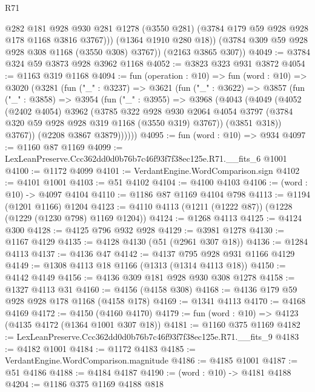 \begin{lexlean}{R71}
\begin{coremodule}
              @282
              @181
              @928
              @930
              @281
              @1278
              (@3550 @281)
              (@3784 @179 @59 @928 @928 @178 @1168 @3816 @3767)))
          (@1364 @1910 @280 @18))
        (@3784 @309 @59 @928 @928 @308 @1168 (@3550 @308) @3767))
      (@2163 @3865 @307))
@4049 := @3784 @324 @59 @3873 @928 @3962 @1168
@4052 := @3823 @323 @931 @3872
@4054 := @1163 @319 @1168
@4094 := fun (operation : @10) =>
  fun (word : @10) =>
  @3020
    (@3281
      (fun ("_" : @3237) =>
      @3621
        (fun ("_" : @3622) =>
        @3857
          (fun ("_" : @3858) =>
          @3954
            (fun ("_" : @3955) =>
            @3968
              (@4043
                (@4049
                  (@4052
                    (@2402 @4054)
                    @3962
                    (@3785
                      @322
                      @928
                      @930
                      @2064
                      @4054
                      @3797
                      (@3784 @320 @59 @928 @928 @319 @1168 (@3550 @319) @3767))
                    (@3851 @318))
                  @3767))
              (@2208 @3867 @3879))))))
@4095 := fun (word : @10) => @934
@4097 := @1160 @87 @1169
@4099 := LexLeanPreserve.Ccc362dd0d0b76b7c46f93f7f38ec125e.R71.__fits_6 @1001
@4100 := @1172 @4099
@4101 := VerdantEngine.WordComparison.sign
@4102 := @4101 @1001
@4103 := @51 @4102
@4104 := @4100 @4103
@4106 := (word : @10) -> @4097 @4104
@4110 := @1186 @87 @1169 @4104 @798
@4113 := @1194 (@1201 @1166) @1204
@4123 := @4110 @4113 (@1211 (@1222 @87)) (@1228 (@1229 (@1230 @798) @1169 @1204))
@4124 := @1268 @4113
@4125 := @4124 @300
@4128 := @4125 @796 @932 @928
@4129 := @3981 @1278
@4130 := @1167 @4129
@4135 := @4128 @4130 (@51 (@2961 @307 @18))
@4136 := @1284 @4113
@4137 := @4136 @47
@4142 := @4137 @795 @928 @931 @1166 @4129
@4149 := @1308 @4113 @18 @1166 (@1313 (@1314 @4113 @18))
@4150 := @4142 @4149
@4156 := @4136 @309 @181 @928 @930 @308 @1278
@4158 := @1327 @4113 @31
@4160 := @4156 (@4158 @308)
@4168 := @4136 @179 @59 @928 @928 @178 @1168 (@4158 @178)
@4169 := @1341 @4113
@4170 := @4168 @4169
@4172 := @4150 (@4160 @4170)
@4179 := fun (word : @10) => @4123 (@4135 @4172 (@1364 @1001 @307 @18))
@4181 := @1160 @375 @1169
@4182 := LexLeanPreserve.Ccc362dd0d0b76b7c46f93f7f38ec125e.R71.__fits_9
@4183 := @4182 @1001
@4184 := @1172 @4183
@4185 := VerdantEngine.WordComparison.magnitude
@4186 := @4185 @1001
@4187 := @51 @4186
@4188 := @4184 @4187
@4190 := (word : @10) -> @4181 @4188
@4204 := @1186
    @375
    @1169
    @4188
    @818

\end{coremodule}
\end{lexlean}
